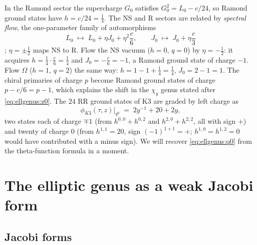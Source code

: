 In the Ramond sector the supercharge $G_0$ satisfies $G_0^2=L_0-c/24$, so Ramond ground
states have $h=c/24=\tfrac14$. The NS and R sectors are related by \emph{spectral flow},
the one-parameter family of automorphisms
\begin{equation}\label{eq:ellgenus:flow}
 L_0\;\mapsto\;L_0+\eta J_0+\eta^2\frac c6,\qquad J_0\;\mapsto\;J_0+\eta\frac c3
\end{equation}
; $\eta=\pm\tfrac12$ maps NS to R. Flow the NS
vacuum ($h=0$, $q=0$) by $\eta=-\tfrac12$: it acquires $h=\tfrac14\cdot\tfrac c6=\tfrac14$ and
$J_0=-\tfrac c6=-1$, a Ramond ground state of charge $-1$. Flow $\Omega$ ($h=1$, $q=2$) the
same way: $h=1-1+\tfrac14=\tfrac14$, $J_0=2-1=1$. The chiral primaries of charge $p$ become
Ramond ground states of charge $p-c/6=p-1$, which explains the shift in the $\chi_y$ genus
stated after \eqref{eq:ellgenus:z0}. The $24$ RR ground states of K3 are graded by left
charge as
\begin{equation}\label{eq:ellgenus:q0}
 \phi_{K3}(\tau,z)\big|_{q^0}\;=\;2y^{-1}+20+2y ,
\end{equation}
two states each of charge $\mp1$ (from $h^{0,0}+h^{0,2}$ and $h^{2,0}+h^{2,2}$, all with sign
$+$) and twenty of charge $0$ (from $h^{1,1}=20$, sign $(-1)^{1+1}=+$; $h^{1,0}=h^{1,2}=0$
would have contributed with a minus sign). We will recover \eqref{eq:ellgenus:q0} from the
theta-function formula in a moment.

\section{The elliptic genus as a weak Jacobi form}\label{sec:ellgenus:jacobi}

\subsection{Jacobi forms}

